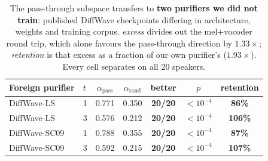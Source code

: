 
\begin{table}[t]
\centering
\caption{The pass-through subspace transfers to \textbf{two purifiers we did not
train}: published DiffWave checkpoints differing in architecture, weights and
training corpus. \emph{excess} divides out the mel$+$vocoder round trip, which
alone favours the pass-through direction by $1.33\times$; \emph{retention} is that
excess as a fraction of our own purifier's ($1.93\times$). Every cell separates on
all 20 speakers.}
\label{tab:transfer}
\small
\begin{tabular}{llccccc}
\toprule
Foreign purifier & $t$ & $\alpha_{\text{pass}}$ & $\alpha_{\text{rand}}$ &
better & $p$ & retention \\
\midrule
DiffWave-LS & 1 & 0.771 & 0.350 & \textbf{20/20} & $<\!10^{-4}$ & \textbf{86\%} \\
DiffWave-LS & 3 & 0.576 & 0.212 & \textbf{20/20} & $<\!10^{-4}$ & \textbf{106\%} \\
DiffWave-SC09 & 1 & 0.788 & 0.355 & \textbf{20/20} & $<\!10^{-4}$ & \textbf{87\%} \\
DiffWave-SC09 & 3 & 0.592 & 0.215 & \textbf{20/20} & $<\!10^{-4}$ & \textbf{107\%} \\
\bottomrule
\end{tabular}
\end{table}

